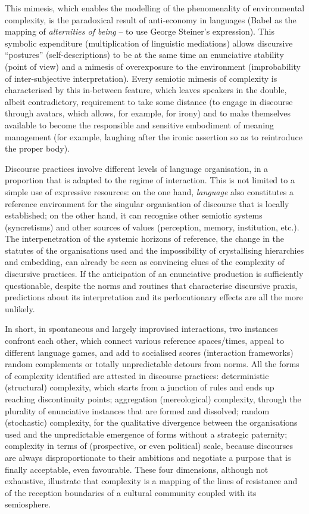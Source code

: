 \documentclass[output=paper]{langscibook}
\begin{document}
This mimesis, which enables the modelling of the phenomenality of environmental complexity, is the paradoxical result of anti-economy in languages (Babel as the mapping of \textit{alternities of being} -- to use George Steiner's expression). This symbolic expenditure (multiplication of linguistic mediations) allows discursive “postures” (self-descriptions) to be at the same time an enunciative stability (point of view) and a mimesis of overexposure to the environment (improbability of inter-subjective interpretation). Every semiotic mimesis of complexity is characterised by this in-between feature, which leaves speakers in the double, albeit contradictory, requirement to take some distance (to engage in discourse through avatars, which allows, for example, for irony) and to make themselves available to become the responsible and sensitive embodiment of meaning management (for example, laughing after the ironic assertion so as to reintroduce the proper body).

Discourse practices involve different levels of language organisation, in a proportion that is adapted to the regime of interaction. This is not limited to a simple use of expressive resources: on the one hand, \textit{language} also constitutes a reference environment for the singular organisation of discourse that is locally established; on the other hand, it can recognise other semiotic systems (syncretisms) and other sources of values (perception, memory, institution, etc.). The interpenetration of the systemic horizons of reference, the change in the statutes of the organisations used and the impossibility of crystallising hierarchies and embedding, can already be seen as convincing clues of the complexity of discursive practices. If the anticipation of an enunciative production is sufficiently questionable, despite the norms and routines that characterise discursive praxis, predictions about its interpretation and its perlocutionary effects are all the more unlikely.

In short, in spontaneous and largely improvised interactions, two instances confront each other, which connect various reference spaces/times, appeal to different language games, and add to socialised scores (interaction frameworks) random complements or totally unpredictable detours from norms. All the forms of complexity identified are attested in discourse practices: deterministic (structural) complexity, which starts from a junction of rules and ends up reaching discontinuity points; aggregation (mereological) complexity, through the plurality of enunciative instances that are formed and dissolved; random (stochastic) complexity, for the qualitative divergence between the organisations used and the unpredictable emergence of forms without a strategic paternity; complexity in terms of  (prospective, or even political) scale, because discourses are always disproportionate to their ambitions and negotiate a purpose that is finally acceptable, even favourable. These four dimensions, although not exhaustive, illustrate that complexity is a mapping of the lines of resistance and of the reception boundaries of a cultural community coupled with its semiosphere. 
\end{document}
